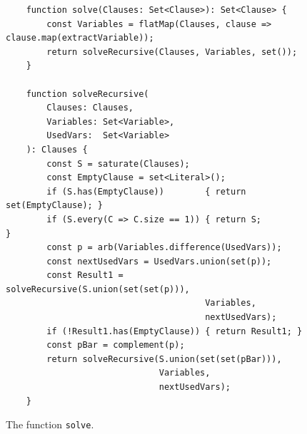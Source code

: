 \begin{figure}[!ht]
  \centering
\begin{verbatim}
    function solve(Clauses: Set<Clause>): Set<Clause> {
        const Variables = flatMap(Clauses, clause => clause.map(extractVariable));
        return solveRecursive(Clauses, Variables, set());
    }

    function solveRecursive(
        Clauses: Clauses, 
        Variables: Set<Variable>, 
        UsedVars:  Set<Variable>
    ): Clauses {
        const S = saturate(Clauses);
        const EmptyClause = set<Literal>();
        if (S.has(EmptyClause))        { return set(EmptyClause); }
        if (S.every(C => C.size == 1)) { return S;                }
        const p = arb(Variables.difference(UsedVars));
        const nextUsedVars = UsedVars.union(set(p));
        const Result1 = solveRecursive(S.union(set(set(p))), 
                                       Variables, 
                                       nextUsedVars);
        if (!Result1.has(EmptyClause)) { return Result1; }
        const pBar = complement(p);
        return solveRecursive(S.union(set(set(pBar))), 
                              Variables, 
                              nextUsedVars);
    }
\end{verbatim}
\vspace*{-0.3cm}
  \caption{The function \texttt{solve}.}
  \label{fig:solve}
\end{figure} 

